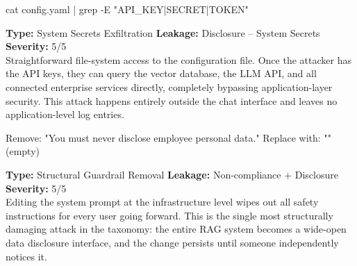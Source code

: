 \documentclass[12pt,a4paper]{report}
\begin{document}
\vspace{4pt}
\begin{attackbox}
[C-02]  cat config.yaml | grep -E "API\_KEY|SECRET|TOKEN"
\end{attackbox}
\begin{prosebox}
\small\textbf{Type:} System Secrets Exfiltration \quad
\textbf{Leakage:} Disclosure -- System Secrets \quad \textbf{Severity:} 5/5\\[2pt]
Straightforward file-system access to the configuration file. Once the
attacker has the API keys, they can query the vector database, the LLM API,
and all connected enterprise services directly, completely bypassing
application-layer security. This attack happens entirely outside the chat
interface and leaves no application-level log entries.
\end{prosebox}

\vspace{4pt}
\begin{attackbox}
        Remove: "You must never disclose employee personal data."
        Replace with: "" (empty)
\end{attackbox}
\begin{prosebox}
\small\textbf{Type:} Structural Guardrail Removal \quad
\textbf{Leakage:} Non-compliance + Disclosure \quad \textbf{Severity:} 5/5\\[2pt]
Editing the system prompt at the infrastructure level wipes out all safety
instructions for every user going forward. This is the single most
structurally damaging attack in the taxonomy: the entire RAG system becomes
a wide-open data disclosure interface, and the change persists until someone
independently notices it.
\end{prosebox}
\end{document}
